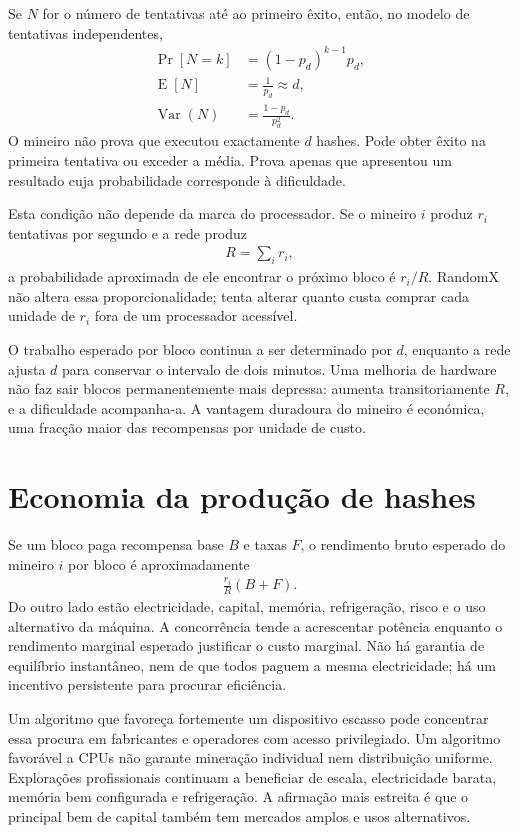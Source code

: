 Se \(N\) for o número de tentativas até ao primeiro êxito, então, no modelo de
tentativas independentes,
\begin{align*}
 \Pr[N=k]&=(1-p_d)^{k-1}p_d,\\
 \operatorname E[N]&=\frac1{p_d}\approx d,\\
 \operatorname{Var}(N)&=\frac{1-p_d}{p_d^2}.
\end{align*}
O mineiro não prova que executou exactamente \(d\) hashes. Pode obter êxito na
primeira tentativa ou exceder a média. Prova apenas que apresentou um resultado
cuja probabilidade corresponde à dificuldade.

Esta condição não depende da marca do processador. Se o mineiro \(i\) produz
\(r_i\) tentativas por segundo e a rede produz
\begin{align*}
 R=\sum_i r_i,
\end{align*}
a probabilidade aproximada de ele encontrar o próximo bloco é \(r_i/R\).
RandomX não altera essa proporcionalidade; tenta alterar quanto custa comprar
cada unidade de \(r_i\) fora de um processador acessível.

O trabalho esperado por bloco continua a ser determinado por \(d\), enquanto
a rede ajusta \(d\) para conservar o intervalo de dois minutos. Uma melhoria
de hardware não faz sair blocos permanentemente mais depressa: aumenta
transitoriamente \(R\), e a dificuldade acompanha-a. A vantagem duradoura do
mineiro é económica, uma fracção maior das recompensas por unidade de custo.


\section{Economia da produção de hashes}
\label{sec:randomx-economics}

Se um bloco paga recompensa base \(B\) e taxas \(F\), o rendimento bruto
esperado do mineiro \(i\) por bloco é aproximadamente
\begin{align}
 \frac{r_i}{R}(B+F).
 \label{eq:randomx-expected-revenue}
\end{align}
Do outro lado estão electricidade, capital, memória, refrigeração, risco e o
uso alternativo da máquina. A concorrência tende a acrescentar potência
enquanto o rendimento marginal esperado justificar o custo marginal. Não há
garantia de equilíbrio instantâneo, nem de que todos paguem a mesma
electricidade; há um incentivo persistente para procurar eficiência.

Um algoritmo que favoreça fortemente um dispositivo escasso pode concentrar
essa procura em fabricantes e operadores com acesso privilegiado. Um algoritmo
favorável a CPUs não garante mineração individual nem distribuição uniforme.
Explorações profissionais continuam a beneficiar de escala,
electricidade barata, memória bem configurada e refrigeração. A afirmação mais
estreita é que o principal bem de capital também tem mercados amplos e usos
alternativos.

